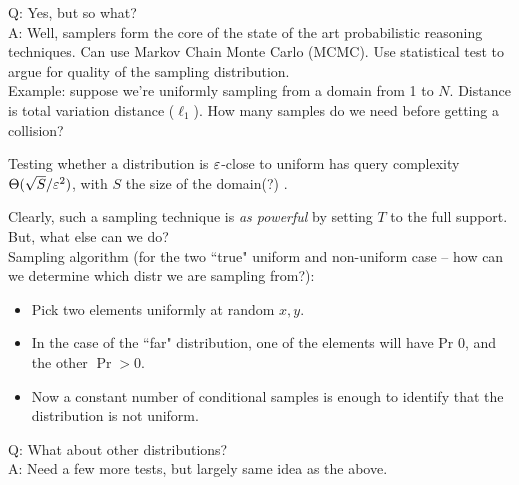 Q: Yes, but so what? \\

A: Well, samplers form the core of the state of the art probabilistic reasoning techniques. Can use Markov Chain Monte Carlo (MCMC). Use statistical test to argue for quality of the sampling distribution. \\

Example: suppose we're uniformly sampling from a domain from 1 to $N$. Distance is total variation distance ($\ell_1$). How many samples do we need before getting a collision?\\

\begin{theorem}
Testing whether a distribution is $\varepsilon$-close to uniform has query complexity $\Theta(\sqrt{S}/\varepsilon^2)$, with $S$ the size of the domain(?) .
\end{theorem}


Clearly, such a sampling technique is {\it as powerful} by setting $T$ to the full support. But, what else can we do? \\

Sampling algorithm (for the two ``true" uniform and non-uniform case -- how can we determine which distr we are sampling from?):
\begin{itemize}
    \item Pick two elements uniformly at random $x,y$.
    \item In the case of the ``far" distribution, one of the elements will have Pr $0$, and the other $\Pr > 0$.
    \item Now a constant number of conditional samples is enough to identify that the distribution is not uniform.
\end{itemize}


Q: What about other distributions? \\

A: Need a few more tests, but largely same idea as the above. \\

